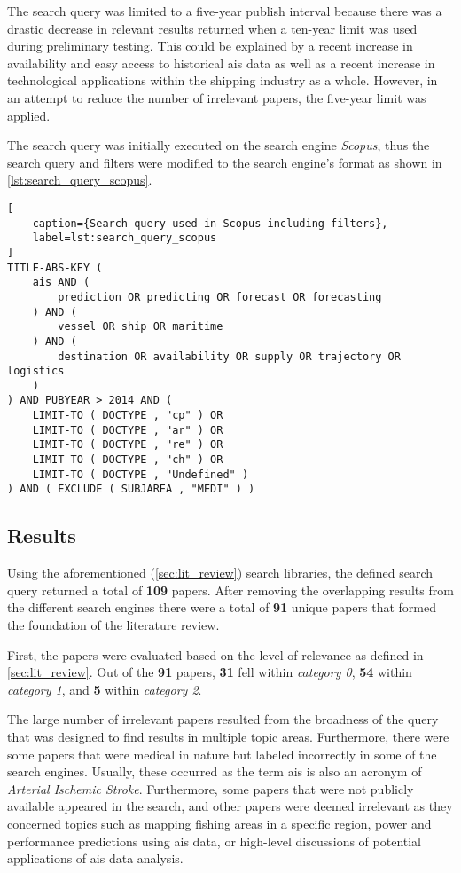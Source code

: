 The search query was limited to a five-year publish interval because there was a drastic decrease in relevant results returned when a ten-year limit was used during preliminary testing. This could be explained by a recent increase in availability and easy access to historical \acrshort{ais} data as well as a recent increase in technological applications within the shipping industry as a whole. However, in an attempt to reduce the number of irrelevant papers, the five-year limit was applied.

The search query was initially executed on the search engine \textit{Scopus}, thus the search query and filters were modified to the search engine's format as shown in \cref{lst:search_query_scopus}.

\begin{lstlisting}[
    caption={Search query used in Scopus including filters},
    label=lst:search_query_scopus
]
TITLE-ABS-KEY (
    ais AND (
        prediction OR predicting OR forecast OR forecasting
    ) AND (
        vessel OR ship OR maritime
    ) AND (
        destination OR availability OR supply OR trajectory OR logistics
    )
) AND PUBYEAR > 2014 AND (
    LIMIT-TO ( DOCTYPE , "cp" ) OR
    LIMIT-TO ( DOCTYPE , "ar" ) OR
    LIMIT-TO ( DOCTYPE , "re" ) OR
    LIMIT-TO ( DOCTYPE , "ch" ) OR
    LIMIT-TO ( DOCTYPE , "Undefined" )
) AND ( EXCLUDE ( SUBJAREA , "MEDI" ) )
\end{lstlisting}

\subsection{Results}
\label{sec:lit_results}

Using the aforementioned (\cref{sec:lit_review}) search libraries, the defined search query returned a total of \textbf{109} papers. After removing the overlapping results from the different search engines there were a total of \textbf{91} unique papers that formed the foundation of the literature review.

First, the papers were evaluated based on the level of relevance as defined in \cref{sec:lit_review}. Out of the \textbf{91} papers, \textbf{31} fell within \textit{category 0}, \textbf{54} within \textit{category 1}, and \textbf{5} within \textit{category 2}.

The large number of irrelevant papers resulted from the broadness of the query that was designed to find results in multiple topic areas. Furthermore, there were some papers that were medical in nature but labeled incorrectly in some of the search engines. Usually, these occurred as the term \acrshort{ais} is also an acronym of \textit{Arterial Ischemic Stroke}. Furthermore, some papers that were not publicly available appeared in the search, and other papers were deemed irrelevant as they concerned topics such as mapping fishing areas in a specific region, power and performance predictions using \acrshort{ais} data, or high-level discussions of potential applications of \acrshort{ais} data analysis.

